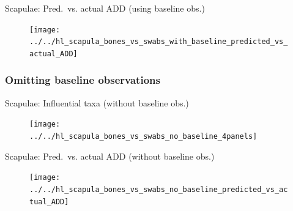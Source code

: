 \documentclass{beamer}
\begin{document}
\begin{frame}{Scapulae: Pred.\ vs. actual ADD (using baseline obs.)}

  \begin{center}
    \begin{figure}
      \texttt{[image: ../../hl\_scapula\_bones\_vs\_swabs\_with\_baseline\_predicted\_vs\_actual\_ADD]}
    \end{figure}
  \end{center}
\end{frame}


\subsubsection[No baseline]{Omitting baseline observations}

\begin{frame}{Scapulae: Influential taxa (without baseline obs.)}

  \begin{center}
    \begin{figure}
      \texttt{[image: ../../hl\_scapula\_bones\_vs\_swabs\_no\_baseline\_4panels]}
    \end{figure}
  \end{center}

\end{frame}


\begin{frame}{Scapulae: Pred.\ vs. actual ADD (without baseline obs.)}

  \begin{center}
    \begin{figure}
      \texttt{[image: ../../hl\_scapula\_bones\_vs\_swabs\_no\_baseline\_predicted\_vs\_actual\_ADD]}
    \end{figure}
  \end{center}

\end{frame}
\end{document}
